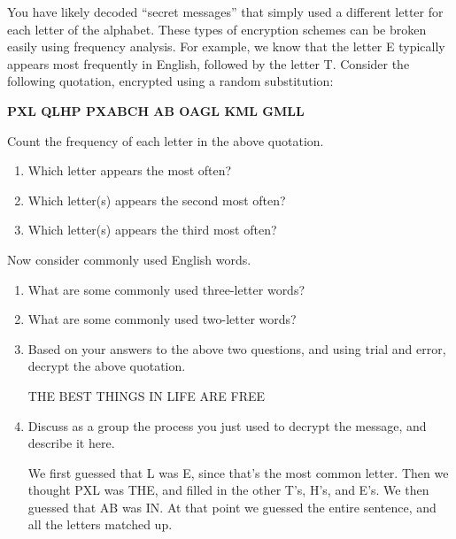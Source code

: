 

You have likely decoded ``secret messages'' that simply used a different letter for each letter of the alphabet.
These types of encryption schemes can be broken easily using frequency analysis.
For example, we know that the letter E typically appears most frequently in English, followed by the letter T.
Consider the following quotation, encrypted using a random substitution:

\begin{center}
\bf PXL QLHP PXABCH AB OAGL KML GMLL
\end{center}




\Q Count the frequency of each letter in the above quotation.

\begin{enumerate}

\item Which letter appears the most often? 

\item Which letter(s) appears the second most often? 

\item Which letter(s) appears the third most often? 

\end{enumerate}


\Q Now consider commonly used English words.

\begin{enumerate}

\item What are some commonly used three-letter words? 

\item What are some commonly used two-letter words? 

\item Based on your answers to the above two questions, and using trial and error, decrypt the above quotation.

\begin{answer}[2em]
\begin{center}
THE BEST THINGS IN LIFE ARE FREE
\end{center}
\end{answer}

\item Discuss as a group the process you just used to decrypt the message, and describe it here.

\begin{answer}[5em]
We first guessed that L was E, since that's the most common letter.
Then we thought PXL was THE, and filled in the other T's, H's, and E's.
We then guessed that AB was IN.
At that point we guessed the entire sentence, and all the letters matched up.
\end{answer}

\end{enumerate}

